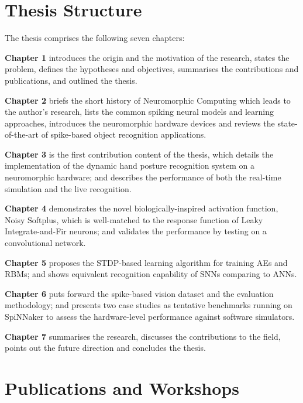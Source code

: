 \section{Thesis Structure}
The thesis comprises the following seven chapters:
	
\textbf{Chapter 1} introduces the origin and the motivation of the research, states the problem, defines the hypotheses and objectives, summarises the contributions and publications, and outlined the thesis. 

\textbf{Chapter 2} briefs the short history of Neuromorphic Computing which leads to the author's research, lists the common spiking neural models and learning approaches, introduces the neuromorphic hardware devices and reviews the state-of-the-art of spike-based object recognition applications. 

\textbf{Chapter 3} is the first contribution content of the thesis, which details the implementation of the dynamic hand posture recognition system on a neuromorphic hardware; and describes the performance of both the real-time simulation and the live recognition. 

\textbf{Chapter 4} demonstrates the novel biologically-inspired activation function, Noisy Softplus, which is well-matched to the response function of Leaky Integrate-and-Fir neurons; and validates the performance by testing on a convolutional network.

\textbf{Chapter 5} proposes the STDP-based learning algorithm for training AEs and RBMs; and shows equivalent recognition capability of SNNs comparing to ANNs.

\textbf{Chapter 6} puts forward the spike-based vision dataset and the evaluation methodology; and presents two case studies as tentative benchmarks running on SpiNNaker to assess the hardware-level performance against software simulators.

\textbf{Chapter 7} summarises the research, discusses the contributions to the field, points out the future direction and concludes the thesis.
   
\section{Publications and Workshops}
